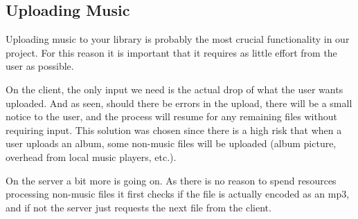 \clearpage\subsection{Uploading Music}

\noindent{}

Uploading music to your library is probably the most crucial functionality in our project. For this reason it is important that
it requires as little effort from the user as possible.

On the client, the only input we need is the actual drop of what the user wants uploaded. And as seen, should there be errors in the
upload, there will be a small notice to the user, and the process will resume for any remaining files without requiring input. This
solution was chosen since there is a high risk that when a user uploads an album, some non-music files will be uploaded (album
 picture, overhead from local music players, etc.).

On the server a bit more is going on. As there is no reason to spend resources processing non-music files it first checks if the file is
actually encoded as an mp3, and if not the server just requests the next file from the client.

